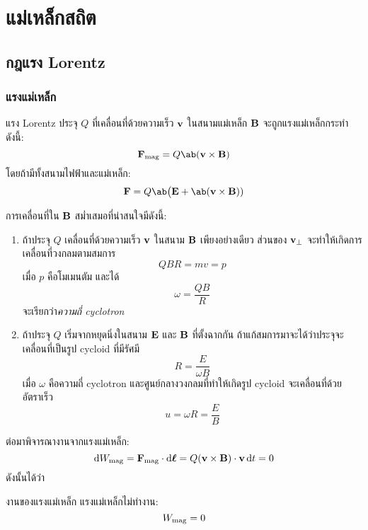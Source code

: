 \chapter{แม่เหล็กสถิต}
\section{กฎแรง Lorentz}
\subsection{แรงแม่เหล็ก}

\begin{lawbox}{แรง Lorentz}
    ประจุ $Q$ ที่เคลื่อนที่ด้วยความเร็ว $\mathbf{v}$ ในสนามแม่เหล็ก $\mathbf{B}$ จะถูกแรงแม่เหล็กกระทำดังนี้:
    \begin{equation}
        \vF_\txt{mag} = Q\ab(\vv\times\vB)
    \end{equation}
    โดยถ้ามีทั้งสนามไฟฟ้าและแม่เหล็ก:
    \begin{equation}
        \vF = Q\ab\big(\vE + \ab(\vv\times\vB))
    \end{equation}
\end{lawbox}
การเคลื่อนที่ใน $\mathbf{B}$ สม่ำเสมอที่น่าสนใจมีดังนี้:
\begin{enumerate}
    \item ถ้าประจุ $Q$ เคลื่อนที่ด้วยความเร็ว $\mathbf{v}$ ในสนาม $\mathbf{B}$ เพียงอย่างเดียว ส่วนของ $\mathbf{v}_\perp$ จะทำให้เกิดการเคลื่อนที่วงกลมตามสมการ
    \[QBR=mv=p\]
    เมื่อ $p$ คือโมเมนตัม และได้
    \[\omega = \frac{QB}{R}\]
    จะเรียกว่า\emph{ความถี่ cyclotron}
    \item ถ้าประจุ $Q$ เริ่มจากหยุดนิ่งในสนาม $\mathbf{E}$ และ $\mathbf{B}$ ที่ตั้งฉากกัน ถ้าแก้สมการมาจะได้ว่าประจุจะเคลื่อนที่เป็นรูป cycloid ที่มีรัศมี
    \[R=\frac{E}{\omega B}\]
    เมื่อ $\omega$ คือความถี่ cyclotron และศูนย์กลางวงกลมที่ทำให้เกิดรูป cycloid จะเคลื่อนที่ด้วยอัตราเร็ว
    \[u=\omega R=\frac{E}{B}\]
\end{enumerate}
ต่อมาพิจารณางานจากแรงแม่เหล็ก:
\[\odif{W}_\txt{mag}=\vF_\txt{mag}\cdot\odif{\vl}=Q(\vv\times\vB)\cdot\vv\odif{t}=0\]
ดังนั้นได้ว่า
\begin{corbox}{งานของแรงแม่เหล็ก}
    แรงแม่เหล็กไม่ทำงาน:
    \begin{equation}
        W_{\mathrm{mag}}=0
    \end{equation}
\end{corbox}

